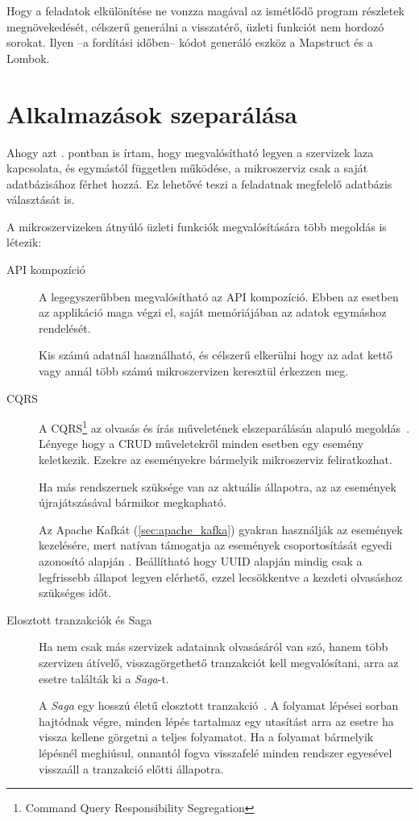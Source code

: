 Hogy a feladatok elkülönítése ne vonzza magával az ismétlődő program részletek megnövekedését, célszerű generálni a visszatérő, üzleti funkciót nem hordozó sorokat. Ilyen --a fordítási időben-- kódot generáló eszköz a Mapstruct és a Lombok.


\section{Alkalmazások szeparálása}\label{sec:alkalmazasok_szeparalasa}
Ahogy azt . pontban is írtam, hogy megvalósítható legyen a szervizek laza kapcsolata, és egymástól független működése, a mikroszerviz csak a saját adatbázisához férhet hozzá. Ez lehetővé teszi a feladatnak megfelelő adatbázis választását is.

A mikroszervizeken átnyúló üzleti funkciók megvalósítására több megoldás is létezik:
\begin{description}
	\item[API kompozíció] A legegyszerűbben megvalósítható az API kompozíció. Ebben az esetben az applikáció maga végzi el, saját memóriájában az adatok egymáshoz rendelését. 
	
	Kis számú adatnál használható, és célszerű elkerülni hogy az adat kettő vagy annál több számú mikroszervizen keresztül érkezzen meg.
	
	\item[CQRS] A CQRS\footnote{Command Query Responsibility Segregation} az  olvasás és írás műveletének elszeparálásán alapuló megoldás~\cite{OReally_Microservice_Architecture_CQRS}. Lényege hogy a CRUD műveletekről minden esetben egy esemény keletkezik. Ezekre az eseményekre bármelyik mikroszerviz feliratkozhat.
	
	Ha más rendszernek szüksége van az aktuális állapotra, az az események újrajátszásával bármikor megkapható.	
	 
	Az Apache Kafkát (\ref{sec:apache_kafka}) gyakran használják az események kezelésére, mert natívan támogatja az események csoportosítását egyedi azonosító alapján . Beállítható hogy UUID alapján mindig csak a legfrissebb állapot legyen elérhető, ezzel lecsökkentve a kezdeti olvasáshoz szükséges időt.
		
	\item[Elosztott tranzakciók és Saga] Ha nem csak más szervizek adatainak olvasásáról van szó, hanem több szervizen átívelő, visszagörgethető tranzakciót kell megvalósítani, arra az esetre találták ki a \textit{Saga}-t.
	
	A \textit{Saga} egy hosszú életű elosztott tranzakció~\cite{OReally_Microservice_Architecture_Saga}. A folyamat lépései sorban hajtódnak végre, minden lépés tartalmaz egy utasítást arra az esetre ha vissza kellene görgetni a teljes folyamatot. Ha a folyamat bármelyik lépésnél meghiúsul, onnantól fogva visszafelé minden rendszer egyesével visszaáll a tranzakció előtti állapotra.
\end{description}


